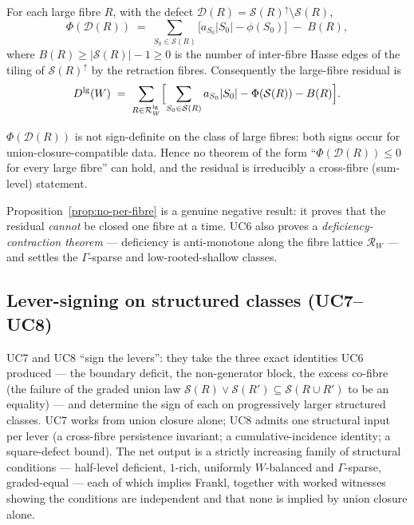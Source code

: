 \begin{theorem}
\label{thm:boundary-conservation}
For each large fibre $R$, with the defect $\mathcal
D(R)=\mathcal S(R)^\uparrow\setminus\mathcal S(R)$,
\[
  \Phi(\mathcal D(R))\;=\;\sum_{S_0\in\mathcal S(R)}
  \bigl[a_{S_0}|S_0|-\phi(S_0)\bigr]\;-\;B(R),
\]
where $B(R)\ge|\mathcal S(R)|-1\ge0$ is the number of inter-fibre
Hasse edges of the tiling of $\mathcal S(R)^\uparrow$ by the retraction
fibres. Consequently the large-fibre residual is
\[
  D^{\mathrm{lg}}(W)\;=\;\sum_{R\in\mathcal R_W^{\mathrm{lg}}}
  \Bigl[\sum_{S_0\in\mathcal S(R)}a_{S_0}|S_0|
  -\Phi(\mathcal S(R))-B(R)\Bigr].
\]
\end{theorem}

\begin{proposition}
\label{prop:no-per-fibre}
$\Phi(\mathcal D(R))$ is not sign-definite on the class of large
fibres: both signs occur for union-closure-compatible data. Hence no
theorem of the form ``$\Phi(\mathcal D(R))\le0$ for every large
fibre'' can hold, and the residual is irreducibly a cross-fibre
(sum-level) statement.
\end{proposition}

Proposition~\ref{prop:no-per-fibre} is a genuine negative result: it
proves that the residual \emph{cannot} be closed one fibre at a time.
UC6 also proves a \emph{deficiency-contraction theorem} --- deficiency
is anti-monotone along the fibre lattice $\mathcal R_W$ --- and settles
the $\Gamma$-sparse and low-rooted-shallow classes.

\subsection{Lever-signing on structured classes (UC7--UC8)}
\label{ssec:uc7-uc8}

UC7 and UC8 ``sign the levers'': they take the three exact identities
UC6 produced --- the boundary deficit, the non-generator block, the
excess co-fibre (the failure of the graded union law $\mathcal
S(R)\vee\mathcal S(R')\subseteq\mathcal S(R\cup R')$ to be an
equality) --- and determine the sign of each on progressively larger
structured classes. UC7 works from union closure alone; UC8 admits one
structural input per lever (a cross-fibre persistence invariant; a
cumulative-incidence identity; a square-defect bound). The net output
is a strictly increasing family of structural conditions --- half-level
deficient, $1$-rich, uniformly $W$-balanced and $\Gamma$-sparse,
graded-equal --- each of which implies Frankl, together with worked
witnesses showing the conditions are independent and that none is
implied by union closure alone.

